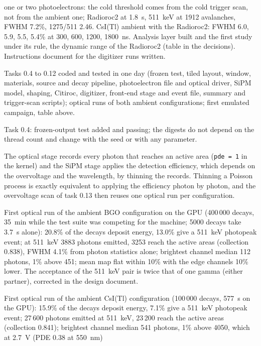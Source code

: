 \documentclass[11pt]{article}
\newcommand{\code}[1]{\texttt{#1}}
\newcommand{\us}{\textmu s\xspace}
\newcommand{\csitl}{CsI(Tl)\xspace}
\begin{document}
\begin{description}
  one or two photoelectrons: the cold threshold comes from the cold trigger
  scan, not from the ambient one; Radioroc2 at 1.8~\us, 511~keV at 1912
  avalanches, FWHM 7.2\%, 1275/511 2.46. \csitl ambient with the Radioroc2:
  FWHM 6.0, 5.9, 5.5, 5.4\% at 300, 600, 1200, 1800~ns. Analysis layer
  built and the first study under its rule, the dynamic range of the
  Radioroc2 (table in the decisions). Instructions document for the
  digitizer runs written.
\item[17 Oct 2026] Tasks 0.4 to 0.12 coded and tested in one day (frozen
  test, tiled layout, window, materials, source and decay pipeline,
  photoelectron file and optical driver, SiPM model, shaping, Citiroc,
  digitizer, front-end stage and event file, summary and trigger-scan
  scripts); optical runs of both ambient configurations; first emulated
  campaign, table above.
\item[17 Oct 2026] Task 0.4: frozen-output test added and passing; the
  digests do not depend on the thread count and change with the seed or
  with any parameter.
\item[17 Oct 2026] The optical stage records every photon that reaches an
  active area (\code{pde = 1} in the kernel) and the SiPM stage applies the
  detection efficiency, which depends on the overvoltage and the wavelength,
  by thinning the records. Thinning a Poisson process is exactly equivalent
  to applying the efficiency photon by photon, and the overvoltage scan of
  task 0.13 then reuses one optical run per configuration.
\item[17 Oct 2026] First optical run of the ambient BGO configuration on the
  GPU (400\,000 decays, 35~min while the test suite was competing for the
  machine; 5000 decays take 3.7~s alone): 20.8\% of the decays deposit
  energy, 13.0\% give a 511~keV photopeak event; at 511~keV 3883 photons
  emitted, 3253 reach the active areas (collection 0.838), FWHM 4.1\% from
  photon statistics alone; brightest channel median 112 photons, 1\% above
  451; mean map flat within 10\% with the edge channels 10\% lower. The
  acceptance of the 511~keV pair is twice that of one gamma (either partner),
  corrected in the design document.
\item[17 Oct 2026] First optical run of the ambient \csitl configuration
  (100\,000 decays, 577~s on the GPU): 15.9\% of the decays deposit energy,
  7.1\% give a 511~keV photopeak event; 27\,600 photons emitted at 511~keV,
  23\,200 reach the active areas (collection 0.841); brightest channel
  median 541 photons, 1\% above 4050, which at 2.7~V (PDE 0.38 at 550~nm)

\end{description}
\end{document}

